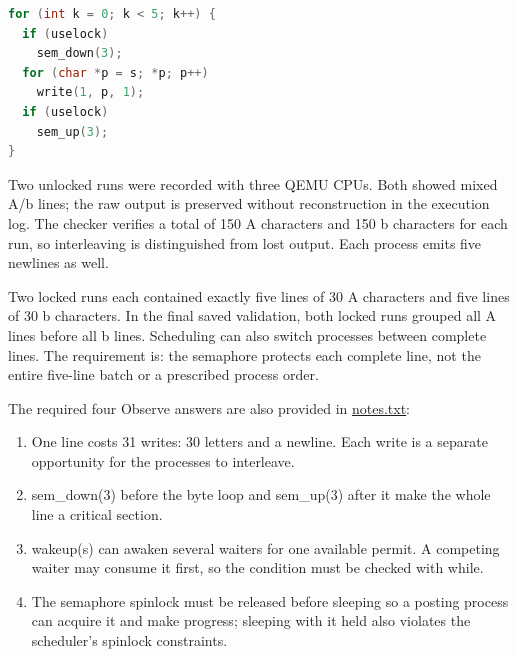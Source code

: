 \documentclass[12pt,a4paper]{article}
\providecommand{\tightlist}{\setlength{\itemsep}{0pt}\setlength{\parskip}{0pt}}
\begin{document}
\par\noindent\begin{minipage}{\linewidth}

\begin{lstlisting}[language=C]
for (int k = 0; k < 5; k++) {
  if (uselock)
    sem_down(3);
  for (char *p = s; *p; p++)
    write(1, p, 1);
  if (uselock)
    sem_up(3);
}
\end{lstlisting}

\end{minipage}\par

Two unlocked runs were recorded with three QEMU CPUs. Both showed mixed
A/b lines; the raw output is preserved without reconstruction in the
execution log. The checker verifies a total of 150
{\ttfamily\fontsize{10}{12}\selectfont A} characters and 150
{\ttfamily\fontsize{10}{12}\selectfont b} characters for each run, so
interleaving is distinguished from lost output. Each process emits five
newlines as well.

Two locked runs each contained exactly five lines of 30
{\ttfamily\fontsize{10}{12}\selectfont A} characters and five lines of
30 {\ttfamily\fontsize{10}{12}\selectfont b} characters. In the final
saved validation, both locked runs grouped all A lines before all b
lines. Scheduling can also switch processes between complete lines. The
requirement is: the semaphore protects each complete line, not the
entire five-line batch or a prescribed process order.

The required four Observe answers are also provided in
\href{https://github.com/igortacu/OS/blob/main/Lab13/notes.txt}{notes.txt}:

\begin{enumerate}
\def\labelenumi{\arabic{enumi}.}
\tightlist
\item
  One line costs 31 writes: 30 letters and a newline. Each write is a
  separate opportunity for the processes to interleave.
\item
  {\ttfamily\fontsize{10}{12}\selectfont sem\_down(3)} before the byte
  loop and {\ttfamily\fontsize{10}{12}\selectfont sem\_up(3)} after it
  make the whole line a critical section.
\item
  {\ttfamily\fontsize{10}{12}\selectfont wakeup(s)} can awaken several
  waiters for one available permit. A competing waiter may consume it
  first, so the condition must be checked with
  {\ttfamily\fontsize{10}{12}\selectfont while}.
\item
  The semaphore spinlock must be released before sleeping so a posting
  process can acquire it and make progress; sleeping with it held also
  violates the scheduler's spinlock constraints.
\end{enumerate}
\end{document}

